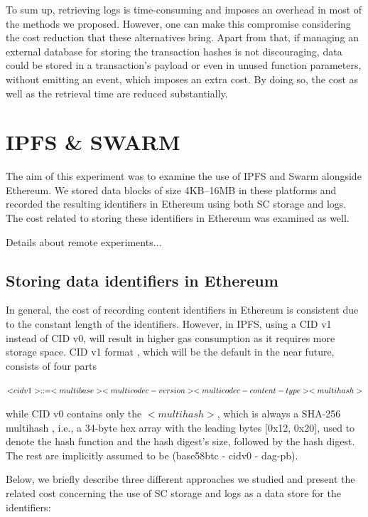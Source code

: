 To sum up, retrieving logs is time-consuming and imposes an overhead in most of the methods we proposed. However, one can make this compromise considering the cost reduction that these alternatives bring. Apart from that, if managing an external database for storing the transaction hashes is not discouraging, data could be stored in a transaction’s payload or even in unused function parameters, without emitting an event, which imposes an extra cost. By doing so, the cost as well as the retrieval time are reduced substantially.

\section{IPFS \& SWARM}\label{sec:evaluation_dfs}
The aim of this experiment was to examine the use of IPFS and Swarm alongside Ethereum. We stored data blocks of size 4KB–16MB in these platforms and recorded the resulting identifiers in Ethereum using both SC storage and logs. The cost related to storing these identifiers in Ethereum was examined as well. 

Details about remote experiments...
\subsection{Storing data identifiers in Ethereum}\label{subsection:evaluation_identifiers}
In general, the cost of recording content identifiers in Ethereum is consistent due to the constant length of the identifiers. However, in IPFS, using a CID v1 instead of CID v0, will result in higher gas consumption as it requires more storage space. CID v1 format \citep{multiformat}, which will be the default in the near future, consists of four parts


\begin{flushleft}
\centering
$\textsc <cidv1> ::= <multibase><multicodec-version><multicodec-content-type><multihash>$
\end{flushleft}

while CID v0 contains only the \(\scriptstyle <multihash>\), which is always a SHA-256 multihash \citep{multiformat}, i.e., a 34-byte hex array with the leading bytes [0x12, 0x20], used to denote the hash function and the hash digest’s size, followed by the hash digest. The rest are implicitly assumed to be (base58btc - cidv0 - dag-pb).

Below, we briefly describe three different approaches we studied and present the related cost concerning the use of SC storage and logs as a data store for the identifiers:

